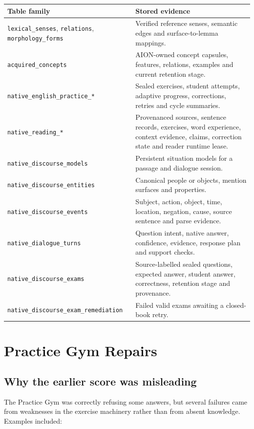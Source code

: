 \documentclass[11pt,a4paper]{article}
\begin{document}
\begin{longtable}{p{} p{}}
\toprule
Table family & Stored evidence \\
\midrule
\endhead
\texttt{lexical\_senses}, \texttt{relations}, \texttt{morphology\_forms} & Verified reference
senses, semantic edges and surface-to-lemma mappings. \\
\texttt{acquired\_concepts} & AION-owned concept capsules, features, relations, examples and
current retention stage. \\
\texttt{native\_english\_practice\_*} & Sealed exercises, student attempts, adaptive progress,
corrections, retries and cycle summaries. \\
\texttt{native\_reading\_*} & Provenanced sources, sentence records, exercises, word experience,
context evidence, claims, correction state and reader runtime lease. \\
\texttt{native\_discourse\_models} & Persistent situation models for a passage and dialogue
session. \\
\texttt{native\_discourse\_entities} & Canonical people or objects, mention surfaces and
properties. \\
\texttt{native\_discourse\_events} & Subject, action, object, time, location, negation, cause,
source sentence and parse evidence. \\
\texttt{native\_dialogue\_turns} & Question intent, native answer, confidence, evidence, response
plan and support checks. \\
\texttt{native\_discourse\_exams} & Source-labelled sealed questions, expected answer, student
answer, correctness, retention stage and provenance. \\
\texttt{native\_discourse\_exam\_remediation} & Failed valid exams awaiting a closed-book retry. \\
\bottomrule
\end{longtable}

\section{Practice Gym Repairs}

\subsection{Why the earlier score was misleading}

The Practice Gym was correctly refusing some answers, but several failures came from weaknesses
in the exercise machinery rather than from absent knowledge. Examples included:
\end{document}
